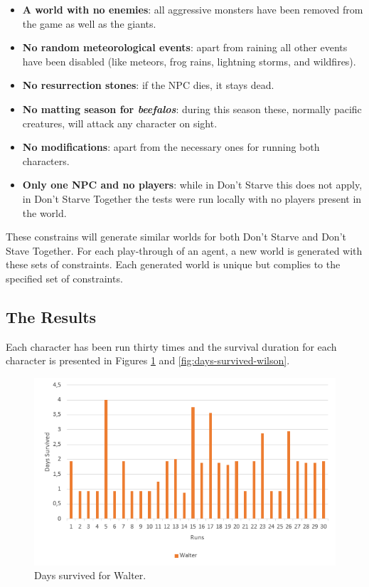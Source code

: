 \begin{itemize}
	 \item \textbf{A world with no enemies}: all aggressive monsters have been removed from the game as well as the giants.
     \item \textbf{No random meteorological events}: apart from raining all other events have been disabled (like meteors,  frog rains, lightning storms, and wildfires).
     \item \textbf{No resurrection stones}: if the \ac{NPC} dies, it stays dead.
     \item \textbf{No matting season for \textit{beefalos}}: during this season these, normally pacific creatures, will attack any character on sight.
     \item \textbf{No modifications}: apart from the necessary ones for running both characters.
     \item \textbf{Only one \ac{NPC} and no players}: while in Don't Starve this does not apply, in Don't Starve Together the tests were run locally with no players present in the world.
\end{itemize}

These constrains will generate similar worlds for both Don't Starve and Don't Stave Together.
For each play-through of an agent, a new world is generated with these sets of constraints.
Each generated world is unique but complies to the specified set of constraints.

\subsection{The Results}

\noindent Each character has been run thirty times and the survival duration for each character is presented in Figures \ref{fig:days-survived-walter} and \ref{fig:days-survived-wilson}.

\begin{figure}
  \centering
  \includegraphics[width=\textwidth]{./Images/days-survived-walter}
  \caption{Days survived for Walter.}
  \label{fig:days-survived-walter}
\end{figure}

